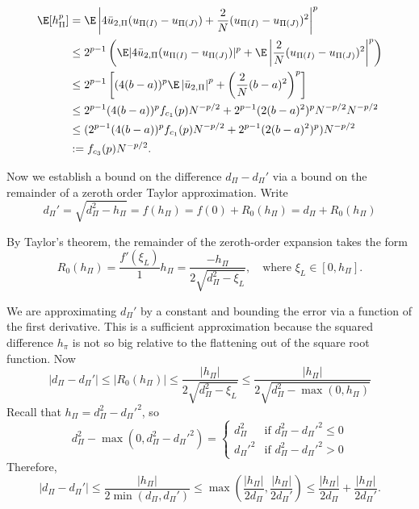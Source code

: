 \begin{align}
  \E[h_{\Pi}^p] &= \E \left | 4\bar{u}_{2,\Pi}(u_{\Pi(I)}-u_{\Pi(J)}) +
      \frac{2}{N}(u_{\Pi(I)}-u_{\Pi(J)})^2 \right |^p \nonumber \\
  &\leq 2^{p-1} \left ( \E |4\bar{u}_{2,\Pi}(u_{\Pi(I)}-u_{\Pi(J)})|^p 
    + \E \left |\frac{2}{N}(u_{\Pi(I)}-u_{\Pi(J)})^2 \right |^p \right ) \nonumber \\
  &\leq 2^{p-1}\left [ (4(b-a))^p \E \left | \bar{u}_{2,\Pi} \right |^p
    + \left ( \frac{2}{N}(b-a)^2 \right )^p \right ] \nonumber \\
  &\leq 2^{p-1} (4(b-a))^p f_{c_1}(p)N^{-p/2} +
  2^{p-1}(2(b-a)^2)^pN^{-p/2}N^{-p/2} \nonumber \\
  &\leq (2^{p-1} (4(b-a))^p f_{c_1}(p)N^{-p/2} +
  2^{p-1}(2(b-a)^2)^p)N^{-p/2} \nonumber \\
  &:= f_{c_3}(p)N^{-p/2} \label{def:hp}.
\end{align}

Now we establish a bound on the difference $d_{\Pi}-d_{\Pi}'$ via a bound on the remainder of a
zeroth order Taylor approximation.  Write
\begin{equation*}
  d_{\Pi}' = \sqrt{d_{\Pi}^2-h_{\Pi}} = f(h_{\Pi}) = f(0) + R_0(h_{\Pi}) = d_{\Pi} + R_0(h_{\Pi})
\end{equation*}

By Taylor's theorem, the remainder of the zeroth-order expansion takes
the form 
\begin{equation*}
  R_0(h_{\Pi}) = \frac{f'(\xi_L)}{1}h_{\Pi} = \frac{-h_{\Pi}}{2\sqrt{d_{\Pi}^2-\xi_L}}, \quad
  \text{where } \xi_L \in [0, h_{\Pi}].
\end{equation*}

We are approximating $d_{\Pi}'$ by a constant and bounding the error via a function of the first
derivative.  This is a sufficient approximation because the squared difference $h_{\pi}$ is not so
big relative to the flattening out of the square root function.
Now
\begin{equation*}
  |d_{\Pi}-d_{\Pi}'| \leq |R_0(h_{\Pi})| \leq \frac{|h_{\Pi}|}{2\sqrt{d_{\Pi}^2-\xi_L}} \leq
  \frac{|h_{\Pi}|}{2\sqrt{d_{\Pi}^2-\max(0, h_{\Pi})}}
\end{equation*}
Recall that $h_{\Pi} = d_{\Pi}^2 - d_{\Pi}'^2$, so 
\begin{equation*}
  d_{\Pi}^2-\max(0, d_{\Pi}^2-d_{\Pi}'^2) = 
  \begin{cases}
    d_{\Pi}^2 & \text{if } d_{\Pi}^2-d_{\Pi}'^2 \leq 0 \\
    d_{\Pi}'^2 & \text{if } d_{\Pi}^2-d_{\Pi}'^2 > 0
  \end{cases}  
\end{equation*}
Therefore, 
\begin{equation*}
  |d_{\Pi}-d_{\Pi}'| \leq \frac{|h_{\Pi}|}{2\min(d_{\Pi}, d_{\Pi}')} \leq \max \left (
    \frac{|h_{\Pi}|}{2d_{\Pi}}, \frac{|h_{\Pi}|}{2d_{\Pi}'} \right ) \leq 
  \frac{|h_{\Pi}|}{2d_{\Pi}} +  \frac{|h_{\Pi}|}{2d_{\Pi}'}.
\end{equation*}


